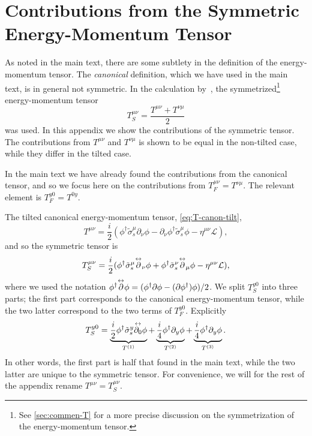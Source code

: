 \chapter{Contributions from the Symmetric Energy-Momentum Tensor}\label{sec:otherterm-appendix}
As noted in the main text, there are some subtlety in the definition of the energy-momentum tensor.
The \emph{canonical} definition, which we have used in the main text, is in general not symmetric.
In the calculation by~\textcite{arjonaFingerprintsConformalAnomaly2019}, the symmetrized\footnote{See \cref{sec:commen-T} for a more precise discussion on the symmetrization of the energy-momentum tensor.}
energy-momentum tensor
\[
T_S^{\mu \nu} = \frac{T^{\mu \nu} + T^{\nu \mu}}{2}
\]
was used.
In this appendix we show the contributions of the symmetric tensor.
The contributions from \( T^{\mu \nu} \) and \( T^{\nu \mu} \) is shown to be equal in the non-tilted case, while they differ in the tilted case.

In the main text we have already found the contributions from the canonical tensor, and so we focus here on the contributions from \( T_F^{\mu \nu } = T^{\nu \mu} \).
The relevant element is \( T_F^{y 0} = T^{0 y} \).

The tilted canonical energy-momentum tensor, \cref{eq:T-canon-tilt},
\[
  T^{\mu\nu} =
  \frac{i}{2} (
  \phi^{\dagger} \tilde{\sigma}_s ^{\mu} \partial_{\nu} \phi
  - \partial_{\nu} \phi^{\dagger} \tilde{\sigma}_s ^{\mu} \phi
  - \eta^{\mu \nu} \mathcal{L}
  ),
\]
and so the symmetric tensor is
\renewcommand\overleftrightarrow[1]{\overset{\tiny\leftrightarrow}{#1}}
\begin{equation}
  \label{eq:87}
  T_S^{\mu\nu} =
  \frac{i}{2} (
  \phi^{\dagger} \tilde{\sigma}_s ^{\mu} \overleftrightarrow{\partial}_{\nu} \phi
  +
  \phi^{\dagger} \tilde{\sigma}_s ^{\nu} \overleftrightarrow{\partial}_{\mu} \phi
  - \eta^{\mu \nu} \mathcal{L}
  ),
\end{equation}
where we used the notation \( \phi^{\dagger} \overleftrightarrow{\partial} \phi = (\phi^{\dagger} \partial \phi - (\partial \phi^{\dagger}) \phi) /2 \).
We split \( T_S^{y0} \) into three parts;
the first part corresponds to the canonical energy-momentum tensor, while the two latter correspond to the two terms of \( T_F^{y0} \).
Explicitly
\begin{equation}
  \label{eq:88}
  T_S^{y 0} =
  \underbrace{\frac{i}{2} \phi^{\dagger} \tilde{\sigma}_s^{y} \overleftrightarrow{\partial_0} \phi}_{T^{(1)}}
  +  \underbrace{ \frac{i}{4} \phi^{\dagger} \partial_y \phi}_{T^{(2)}}
  + \underbrace{ \frac{i}{4} \phi^{\dagger} \partial_y \phi}_{T^{(3)}}.
\end{equation}
In other words, the first part is half that found in the main text, while the two latter are unique to the symmetric tensor.
For convenience, we will for the rest of the appendix rename \( T^{\mu \nu} = T_S^{\mu \nu} \).

